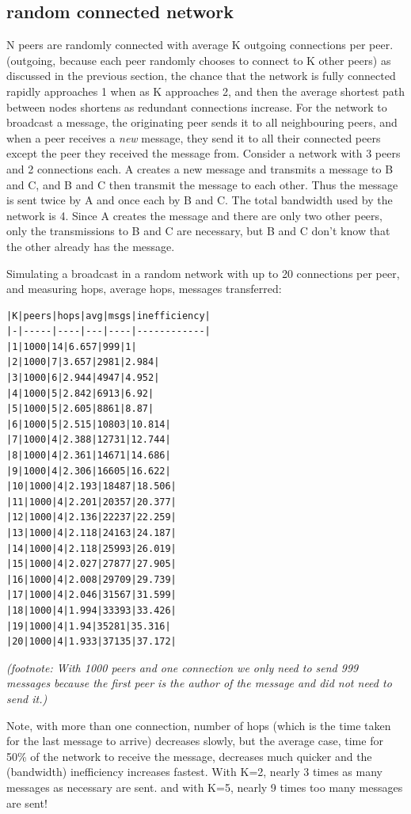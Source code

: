 \documentclass[sigconf]{acmart}
\begin{document}
\subsection{random connected network}

N peers are randomly connected with average K outgoing connections per
peer.  (outgoing, because each peer randomly chooses to connect to K
other peers) as discussed in the previous section, the chance that the
network is fully connected rapidly approaches 1 when as K approaches
2, and then the average shortest path between nodes shortens as
redundant connections increase.  For the network to broadcast a
message, the originating peer sends it to all neighbouring peers, and
when a peer receives a {\em new} message, they send it to all their
connected peers except the peer they received the message
from. Consider a network with 3 peers and 2 connections each.  A
creates a new message and transmits a message to B and C, and B and C
then transmit the message to each other. Thus the message is sent
twice by A and once each by B and C. The total bandwidth used by the
network is 4. Since A creates the message and there are only two other
peers, only the transmissions to B and C are necessary, but B and C
don't know that the other already has the message.

Simulating a broadcast in a random network with up to 20 connections
per peer, and measuring hops, average hops, messages transferred:

\begin{verbatim}
|K|peers|hops|avg|msgs|inefficiency|
|-|-----|----|---|----|------------|
|1|1000|14|6.657|999|1|
|2|1000|7|3.657|2981|2.984|
|3|1000|6|2.944|4947|4.952|
|4|1000|5|2.842|6913|6.92|
|5|1000|5|2.605|8861|8.87|
|6|1000|5|2.515|10803|10.814|
|7|1000|4|2.388|12731|12.744|
|8|1000|4|2.361|14671|14.686|
|9|1000|4|2.306|16605|16.622|
|10|1000|4|2.193|18487|18.506|
|11|1000|4|2.201|20357|20.377|
|12|1000|4|2.136|22237|22.259|
|13|1000|4|2.118|24163|24.187|
|14|1000|4|2.118|25993|26.019|
|15|1000|4|2.027|27877|27.905|
|16|1000|4|2.008|29709|29.739|
|17|1000|4|2.046|31567|31.599|
|18|1000|4|1.994|33393|33.426|
|19|1000|4|1.94|35281|35.316|
|20|1000|4|1.933|37135|37.172|
\end{verbatim}

{\em (footnote: With 1000 peers and one connection we only need to send
999 messages because the first peer is the author of the message
and did not need to send it.)}

Note, with more than one connection, number of hops (which is the time
taken for the last message to arrive) decreases slowly, but the
average case, time for 50\% of the network to receive the message,
decreases much quicker and the (bandwidth) inefficiency increases
fastest.  With K=2, nearly 3 times as many messages as necessary are
sent.  and with K=5, nearly 9 times too many messages are sent!
\end{document}
